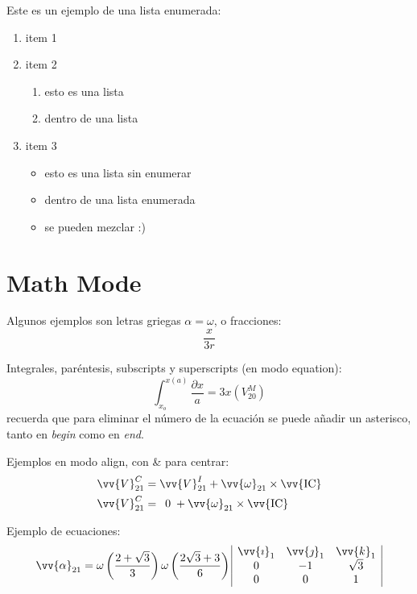 \documentclass{article} %
\begin{document}
\bigskip %
Este es un ejemplo de una lista enumerada:
\begin{enumerate}
    \item item 1
    \item item 2
        \begin{enumerate}
            \item esto es una lista
            \item dentro de una lista
        \end{enumerate}
    \item item 3
        \begin{itemize}
            \item esto es una lista sin enumerar
            \item dentro de una lista enumerada
            \item se pueden mezclar :)
        \end{itemize}
\end{enumerate}

\section{Math Mode}
Algunos ejemplos son letras griegas $\alpha = \omega$, o fracciones: $$ \frac{x}{3r} $$

Integrales, paréntesis, subscripts y superscripts (en modo equation):
\begin{equation}
    \int_{x_o}^{x(a)} \frac{\partial x}{a} = 3x \left( V_{20}^M \right)
\end{equation}
recuerda que para eliminar el número de la ecuación se puede añadir un asterisco, tanto en \textit{begin} como en \textit{end}.

Ejemplos en modo align, con \& para centrar:
\begin{align}
    \vv{V}_{21}^C &= \vv{V}_{21}^I + \vv{\omega}_{21} \times \vv{\text{IC}} \\
    \vv{V}_{21}^C &= \enspace0\; + \vv{\omega}_{21} \times \vv{\text{IC}} \nonumber %
\end{align}

Ejemplo de ecuaciones:
\begin{equation}
    \vv{\alpha}_{21} = \omega \left(\frac{2+\sqrt{3}}{3}\right) \omega \left(\frac{2\sqrt{3}+3}{6}\right)
        \begin{array}{|ccc|}
             \vv{\imath}_1 & \vv{\jmath}_1 & \vv{k}_1\\
             0 & -1 & \sqrt{3} \\
             0 & 0 & 1 \\
        \end{array}
\end{equation}
\end{document}
